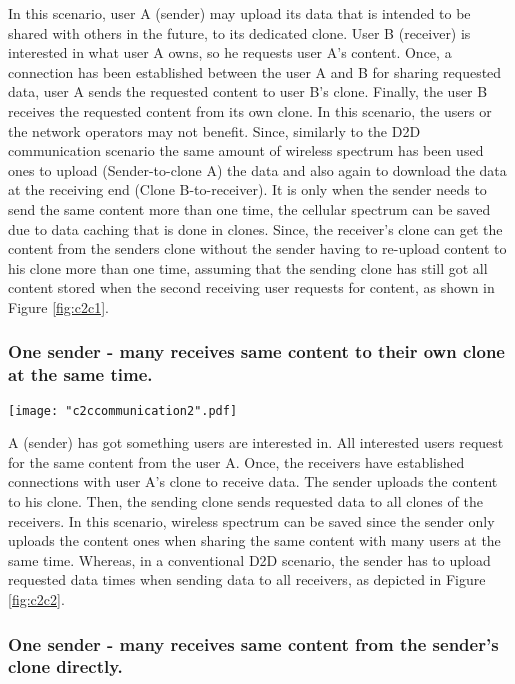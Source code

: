 \documentclass[12pt,journal,compsoc, onecolumn]{IEEEtran}
\begin{document}
In this scenario, user A (sender) may upload its data that is intended to be shared with others in the future, to its dedicated clone. User B (receiver) is interested in what user A owns, so he requests user A's content. Once, a connection has been established between the user A and B for sharing requested data, user A sends the requested content to user B's clone. Finally, the user B receives the requested content from its own clone. In this scenario, the users or the network operators may not benefit. Since, similarly to the D2D communication scenario the same amount of wireless spectrum has been used ones to upload (Sender-to-clone A) the data and also again to download the data at the receiving end (Clone B-to-receiver). It is only when the sender needs to send the same content more than one time, the cellular spectrum can be saved due to data caching that is done in clones. Since, the receiver's clone can get the content from the senders clone without the sender having to re-upload content to his clone more than one time, assuming that the sending clone has still got all content stored when the second receiving user requests for content, as shown in Figure \ref{fig:c2c1}.

\subsubsection*{One sender - many receives same content to their own clone at the same time.}

\begin{figure*}[ht]
\centering
\texttt{[image: "c2ccommunication2".pdf]}
\caption{\label{fig:c2c2} C2C: One sender - many receives same content to their own clone at the same time.}
\end{figure*} 

A (sender) has got something  users are interested in. All interested users request for the same content from the user A. Once, the receivers have established connections with user A's clone to receive data. The sender uploads the content to his clone. Then, the sending clone sends requested data to all clones of the receivers. In this scenario, wireless spectrum can be saved since the sender only uploads the content ones when sharing the same content with many users at the same time. Whereas, in a conventional D2D scenario, the sender has to upload requested data  times when sending data to all  receivers, as depicted in Figure \ref{fig:c2c2}.

\subsubsection*{One sender - many receives same content from the sender's clone directly.}
\end{document}
